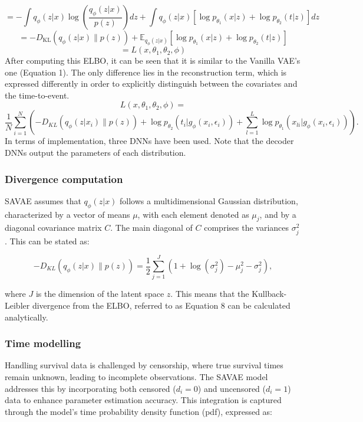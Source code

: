 \documentclass{article}
\begin{document}
\[
= -\int q_\phi(z|x) \log \left( \frac{q_\phi(z|x)}{p(z)} \right) dz + \int q_\phi(z|x) \left[ \log p_{\theta_1}(x|z) + \log p_{\theta_2}(t|z) \right] dz
\]
\begin{equation}
= -D_{\text{KL}}(q_\phi(z|x) \parallel p(z)) + \mathbb{E}_{q_\phi(z|x)} \left[ \log p_{\theta_1}(x|z) + \log p_{\theta_2}(t|z) \right]
\end{equation}
\[
= L(x, \theta_1, \theta_2, \phi)
\]
After computing this ELBO, it can be seen that it is similar to the Vanilla VAE’s one (Equation 1). The only difference lies in the reconstruction term, which is expressed differently in order to explicitly distinguish between the covariates and the time-to-event.
\[
L(x, \theta_1, \theta_2, \phi)=
\]
\begin{equation}
\frac{1}{N} \sum_{i=1}^N \left( -D_{KL}(q_\phi(z|x_i) \parallel p(z)) + \log p_{\theta_2}(t_i|g_\phi(x_i, \epsilon_i)) + \sum_{l=1}^L \log p_{\theta_1}(x_{li}|g_\phi(x_i, \epsilon_i)) \right).
\end{equation}
In terms of implementation, three DNNs have been used. Note that the decoder DNNs output the parameters of each distribution.

\subsubsection{Divergence computation}

SAVAE assumes that \( q_\phi(z|x) \) follows a multidimensional Gaussian distribution, characterized by a vector of means \( \mu \), with each element denoted as \( \mu_j \), and by a diagonal covariance matrix \( C \). The main diagonal of \( C \) comprises the variances \( \sigma_j^2 \). This can be stated as:

\begin{equation}
-D_{KL}(q_\phi(z|x) \parallel p(z)) = \frac{1}{2} \sum_{j=1}^J \left(1 + \log(\sigma_j^2) - \mu_j^2 - \sigma_j^2\right),
\end{equation}

where \(J\) is the dimension of the latent space \(z\). This means that the Kullback-Leibler divergence from the ELBO, referred to as Equation 8 can be calculated analytically.

\subsubsection{Time modelling}
Handling survival data is challenged by censorship, where true survival times remain unknown, leading to incomplete observations. The SAVAE model addresses this by incorporating both censored (\(d_i=0\)) and uncensored (\(d_i=1\)) data to enhance parameter estimation accuracy. This integration is captured through the model's time probability density function (pdf), expressed as:
\end{document}
